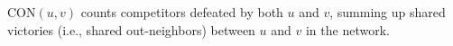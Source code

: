 \documentclass[preview]{standalone}
\begin{document}
$\text{CON}(u, v)$ counts competitors defeated by both $u$ and $v$, summing up shared victories (i.e., shared out-neighbors) between $u$ and $v$ in the network.\\
\end{document}
